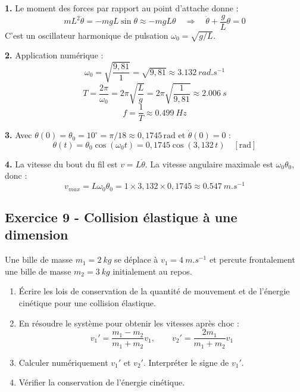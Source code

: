 \documentclass[12pt,a4paper]{article}
\begin{document}
\begin{boitecorrige}
\textbf{1.} Le moment des forces par rapport au point d'attache donne :
\[
mL^2\ddot{\theta} = -mgL\sin\theta \approx -mgL\theta \quad \Rightarrow \quad \ddot{\theta} + \frac{g}{L}\theta = 0
\]
C'est un oscillateur harmonique de pulsation $\omega_0 = \sqrt{g/L}$.

\textbf{2.} Application numérique :
\[
\omega_0 = \sqrt{\frac{9{,}81}{1}} = \sqrt{9{,}81} \approx \qty{3.132}{rad.s^{-1}}
\]
\[
T = \frac{2\pi}{\omega_0} = 2\pi\sqrt{\frac{L}{g}} = 2\pi\sqrt{\frac{1}{9{,}81}} \approx \qty{2.006}{s}
\]
\[
f = \frac{1}{T} \approx \qty{0.499}{Hz}
\]

\textbf{3.} Avec $\theta(0) = \theta_0 = 10^\circ  = \pi/18 \approx 0{,}1745\,\text{rad}$ et $\dot\theta(0) = 0$ :
\[
\theta(t) = \theta_0\cos(\omega_0 t) = 0{,}1745\cos(3{,}132\,t) \quad [\text{rad}]
\]

\textbf{4.} La vitesse du bout du fil est $v = L\dot\theta$. La vitesse angulaire maximale est $\omega_0\theta_0$, donc :
\[
v_{max} = L\omega_0\theta_0 = 1 \times 3{,}132 \times 0{,}1745 \approx \qty{0.547}{m.s^{-1}}
\]
\end{boitecorrige}

\subsection*{Exercice 9 - Collision élastique à une dimension \niveau{\moyen}}

\begin{boiteexercice}
Une bille de masse $m_1 = \qty{2}{kg}$ se déplace à $v_1 = \qty{4}{m.s^{-1}}$ et percute frontalement une bille de masse $m_2 = \qty{3}{kg}$ initialement au repos.
\begin{enumerate}
  \item Écrire les lois de conservation de la quantité de mouvement et de l'énergie cinétique pour une collision élastique.
  \item En résoudre le système pour obtenir les vitesses après choc :
  \[
  v_1' = \frac{m_1-m_2}{m_1+m_2}v_1, \qquad v_2' = \frac{2m_1}{m_1+m_2}v_1
  \]
  \item Calculer numériquement $v_1'$ et $v_2'$. Interpréter le signe de $v_1'$.
  \item Vérifier la conservation de l'énergie cinétique.
\end{enumerate}
\end{boiteexercice}
\end{document}
